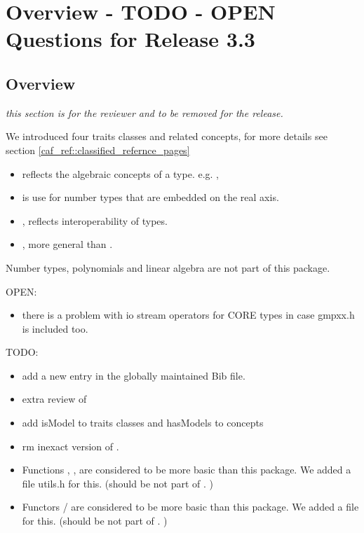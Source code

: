 \section{Overview - TODO - OPEN Questions for Release 3.3}

\subsection{Overview}
{\em this section is for the reviewer and to be removed for the release. }

We introduced four traits classes and related concepts, for more details see 
section \ref{caf_ref::classified_refernce_pages}
\begin{itemize}
\item {} reflects the algebraic concepts of a 
      type. e.g. , 
\item {} is use for number types that are embedded on 
      the real axis. 
\item {}, reflects interoperability of types. 
\item {}, more general than .
\end{itemize}

Number types, polynomials and linear algebra are not part of this package. 

OPEN:
\begin{itemize}
\item there is a problem with io stream operators for CORE types in case 
      gmpxx.h is included too. 
\end{itemize}

TODO:
\begin{itemize} 
\item add a new entry in the globally maintained Bib file.
\item extra review of 
\item add isModel to traits classes and hasModels to concepts 
\item rm inexact version of . 
\item Functions , ,  are considered to be more 
      basic than this package. We added a file utils.h for this. 
      (should be not part of . )
\item Functors / are considered to be more basic than 
      this package. We added a file  for this. 
      (should be not part of . )   
\end{itemize}

